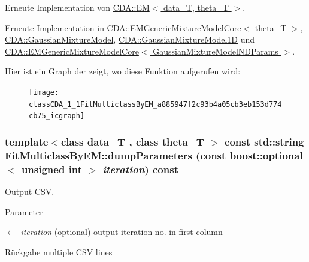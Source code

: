 Erneute Implementation von \hyperlink{classCDA_1_1EM_aa3edb551271b47675c817fa6c302741d}{CDA::EM$<$ data\_\-T, theta\_\-T $>$}.



Erneute Implementation in \hyperlink{classCDA_1_1EMGenericMixtureModelCore_a6e444765b04615888d41c4ab6c82ae61}{CDA::EMGenericMixtureModelCore$<$ theta\_\-T $>$}, \hyperlink{classCDA_1_1GaussianMixtureModel_aec72323935694359e18e3363ceaa40e7}{CDA::GaussianMixtureModel}, \hyperlink{classCDA_1_1GaussianMixtureModel1D_a08a734c5b74bccda43429df49db58edf}{CDA::GaussianMixtureModel1D} und \hyperlink{classCDA_1_1EMGenericMixtureModelCore_a6e444765b04615888d41c4ab6c82ae61}{CDA::EMGenericMixtureModelCore$<$ GaussianMixtureModelNDParams $>$}.



Hier ist ein Graph der zeigt, wo diese Funktion aufgerufen wird:\nopagebreak
\begin{figure}[H]
\begin{center}
\leavevmode
\texttt{[image: classCDA\_1\_1FitMulticlassByEM\_a885947f2c93b4a05cb3eb153d774cb75\_icgraph]}
\end{center}
\end{figure}


\hypertarget{classCDA_1_1FitMulticlassByEM_abd04a7135250a427a100c95bf2bf43a9}{
\subsubsection[{dumpParameters}]{\setlength{\rightskip}{0pt plus 5cm}template$<$class data\_\-T , class theta\_\-T $>$ const std::string FitMulticlassByEM::dumpParameters (const boost::optional$<$ unsigned int $>$ {\em iteration}) const}}
\label{classCDA_1_1FitMulticlassByEM_abd04a7135250a427a100c95bf2bf43a9}


Output CSV. 


\begin{DoxyParams}{Parameter}
\item[\mbox{$\leftarrow$} {\em iteration}](optional) output iteration no. in first column\end{DoxyParams}
\begin{DoxyReturn}{Rückgabe}
multiple CSV lines 
\end{DoxyReturn}


